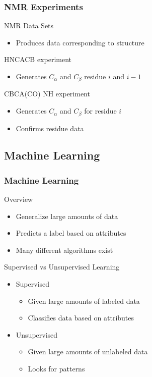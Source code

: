 \documentclass{beamer}
\begin{document}
\begin{frame}
	\frametitle{NMR Experiments}
	\begin{block}{NMR Data Sets}
		\begin{itemize}
			\item Produces data corresponding to structure
		\end{itemize}
	\end{block}
	\begin{block}{HNCACB experiment}
		\begin{itemize}
			\item Generates $C_\alpha$ and $C_{\beta}$ residue $i$ and $i-1$
		\end{itemize}
	\end{block}
	\begin{block}{CBCA(CO) NH experiment\autocite{aria}}
		\begin{itemize}
			\item Generates $C_\alpha$ and $C_{\beta}$ for residue $i$
			\item Confirms residue data
		\end{itemize}
	\end{block}
\end{frame}

\subsection{Machine Learning} 
\begin{frame}
	\frametitle{Machine Learning}
	\begin{block}{Overview}
		\begin{itemize}
			\item Generalize large amounts of data
			\item Predicts a label based on attributes
			\item Many different algorithms exist
		\end{itemize}
	\end{block}
	\begin{block}{Supervised vs Unsupervised Learning}
		\begin{itemize}
			\item Supervised
			\begin{itemize}
				\item Given large amounts of labeled data
				\item Classifies data based on attributes
			\end{itemize}

			\item Unsupervised
			\begin{itemize}
				\item Given large amounts of unlabeled data
				\item Looks for patterns
			\end{itemize}
		\end{itemize}
	\end{block}
\end{frame}
\end{document}
